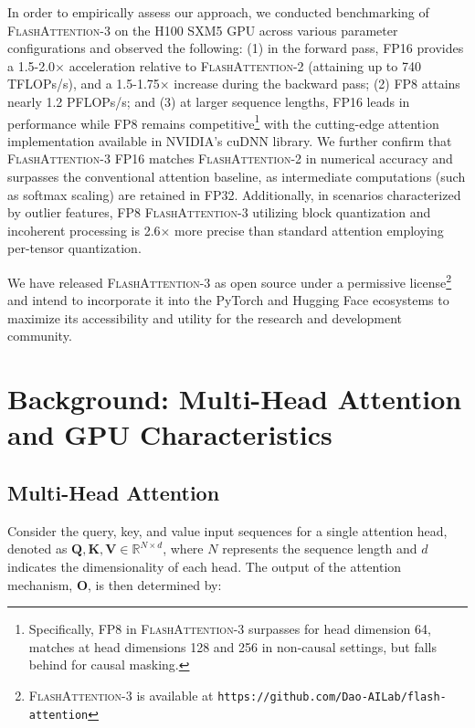 In order to empirically assess our approach, we conducted benchmarking of \textsc{FlashAttention-3} on the H100 SXM5 GPU across various parameter configurations and observed the following: (1) in the forward pass, FP16 provides a 1.5-2.0$\times$ acceleration relative to \textsc{FlashAttention-2} (attaining up to 740 TFLOPs/s), and a 1.5-1.75$\times$ increase during the backward pass; (2) FP8 attains nearly 1.2 PFLOPs/s; and (3) at larger sequence lengths, FP16 leads in performance while FP8 remains competitive\footnote{Specifically, FP8 in \textsc{FlashAttention-3} surpasses for head dimension 64, matches at head dimensions 128 and 256 in non-causal settings, but falls behind for causal masking.} with the cutting-edge attention implementation available in NVIDIA's cuDNN library. We further confirm that \textsc{FlashAttention-3} FP16 matches \textsc{FlashAttention-2} in numerical accuracy and surpasses the conventional attention baseline, as intermediate computations (such as softmax scaling) are retained in FP32. Additionally, in scenarios characterized by outlier features, FP8 \textsc{FlashAttention-3} utilizing block quantization and incoherent processing is 2.6$\times$ more precise than standard attention employing per-tensor quantization.

We have released \textsc{FlashAttention-3} as open source under a permissive license\footnote{\textsc{FlashAttention-3}
  is available at \texttt{https://github.com/Dao-AILab/flash-attention}} and intend to incorporate it into the PyTorch and Hugging Face ecosystems to maximize its accessibility and utility for the research and development community.

\section{Background: Multi-Head Attention and GPU Characteristics}
\label{sec:background}

\subsection{Multi-Head Attention}
\label{subsec:multi_head_attn}

Consider the query, key, and value input sequences for a single attention head, denoted as $\mathbf{Q}, \mathbf{K}, \mathbf{V} \in \mathbb{R}^{N \times d}$, where $N$ represents the sequence length and $d$ indicates the dimensionality of each head. The output of the attention mechanism, $\mathbf{O}$, is then determined by:

